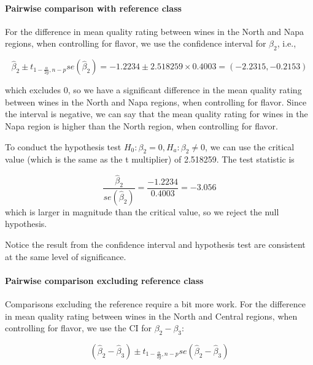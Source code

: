 \documentclass[
]{book}
\begin{document}
\hypertarget{pairwise-comparison-with-reference-class}{%
\paragraph*{Pairwise comparison with reference class}\label{pairwise-comparison-with-reference-class}}

For the difference in mean quality rating between wines in the North and Napa regions, when controlling for flavor, we use the confidence interval for \(\beta_2\), i.e.,

\[
\hat{\beta}_2 \pm t_{1-\frac{\alpha}{2g}, n-p} se(\hat{\beta}_2) = {-1.2234} \pm 2.518259 \times 0.4003 = (-2.2315, -0.2153)
\]

which excludes 0, so we have a significant difference in the mean quality rating between wines in the North and Napa regions, when controlling for flavor. Since the interval is negative, we can say that the mean quality rating for wines in the Napa region is higher than the North region, when controlling for flavor.

To conduct the hypothesis test \(H_0: \beta_2 = 0, H_a: \beta_2 \neq 0\), we can use the critical value (which is the same as the t multiplier) of 2.518259. The test statistic is

\[
\frac{\hat{\beta}_2}{se(\hat{\beta}_2)} = \frac{-1.2234}{0.4003} = -3.056
\]
which is larger in magnitude than the critical value, so we reject the null hypothesis.

Notice the result from the confidence interval and hypothesis test are consistent at the same level of significance.

\hypertarget{pairwise-comparison-excluding-reference-class}{%
\paragraph*{Pairwise comparison excluding reference class}\label{pairwise-comparison-excluding-reference-class}}

Comparisons excluding the reference require a bit more work. For the difference in mean quality rating between wines in the North and Central regions, when controlling for flavor, we use the CI for \(\beta_2 - \beta_3\):

\[
(\hat{\beta}_2 - \hat{\beta}_3) \pm t_{1-\frac{\alpha}{2g}, n-p} se(\hat{\beta}_2 - \hat{\beta}_3)
\]
\end{document}
